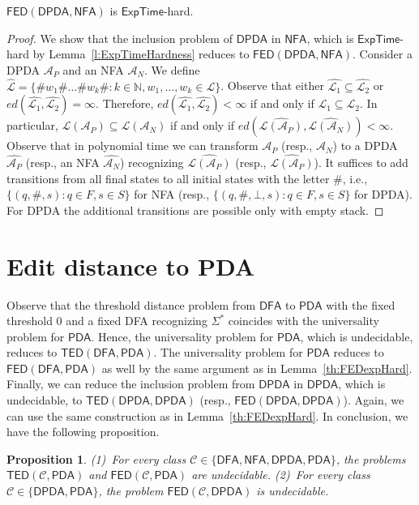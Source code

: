 \documentclass{CSML}
\newcommand{\aut}{\mathcal{A}}
\newcommand{\EXPTIME}{\textsf{ExpTime}}
\newcommand{\class}{\mathcal{C}}
\newcommand{\DFA}{\mathsf{DFA}}
\newcommand{\NFA}{\mathsf{NFA}}
\newcommand{\PDA}{\mathsf{PDA}}
\newcommand{\DPDA}{\mathsf{DPDA}}
\newcommand{\TED}{\mathsf{TED}}
\newcommand{\FED}{\mathsf{FED}}
\newcommand{\N}{\mathbb{N}}
\newcommand{\lang}{\mathcal{L}}
\newcommand{\ed}{ed}
\newtheorem{proposition}[theorem]{Proposition}
\begin{document}
\begin{lem}
$\FED(\DPDA,\NFA)$ is $\EXPTIME$-hard.
\label{th:FEDexpHard}
\end{lem}
\begin{proof}
We show that the inclusion problem of $\DPDA$ in $\NFA$, which is $\EXPTIME$-hard by Lemma~\ref{l:ExpTimeHardness} reduces to 
$\FED(\DPDA,\NFA)$. 
Consider  a DPDA $\aut_P$ and an NFA $\aut_N$.
We define $\widehat{\lang} = \{ \# w_1 \# \ldots \# w_k \# : k \in \N, w_1, \ldots, w_k \in \lang\}$.
Observe that either  $\widehat{\lang_1} \subseteq \widehat{\lang_2}$ or $\ed(\widehat{\lang_1},\widehat{\lang_2}) = \infty$.
Therefore, $\ed(\widehat{\lang_1},\widehat{\lang_2}) < \infty$ if and only if 
$\lang_1 \subseteq \lang_2$. 
In particular, $\lang(\aut_P) \subseteq \lang(\aut_N)$ if and only if
$\ed(\widehat{\lang(\aut_P)},\widehat{\lang(\aut_N)}) < \infty$.
Observe that in polynomial time we can transform $\aut_P$ (resp., $\aut_N$) to 
a DPDA $\widehat{\aut_P}$ (resp., an NFA $\widehat{\aut_N}$) recognizing
$\widehat{\lang(\aut_P)}$ (resp., $\widehat{\lang(\aut_P)}$). 
It suffices to add transitions 
from all final states to all initial states with the letter $\#$, i.e.,
$\{ (q,\#,s) : q \in F, s \in S \}$ for NFA (resp., $\{ (q,\#, \bot,s) : q \in F, s \in S \}$ for DPDA).
For DPDA the additional transitions are possible only with empty stack.
\end{proof}



 

\section{Edit distance to PDA}
\makeatletter{}\label{s:fromPDA}

Observe that the threshold distance problem from $\DFA$ to $\PDA$ with the fixed threshold $0$
and a fixed DFA recognizing $\Sigma^*$ coincides with the universality problem for $\PDA$. 
Hence, the universality problem for $\PDA$, which is undecidable, reduces to $\TED(\DFA, \PDA)$.
The universality problem for $\PDA$ reduces to $\FED(\DFA, \PDA)$ as well by 
the same argument as in Lemma~\ref{th:FEDexpHard}. 
Finally, we can reduce the inclusion problem from $\DPDA$ in $\DPDA$, which is undecidable, to
$\TED(\DPDA, \DPDA)$ (resp., $\FED(\DPDA, \DPDA)$). Again, we can use 
the same construction as in Lemma~\ref{th:FEDexpHard}. 
In conclusion, we have the following proposition.

\begin{proposition}
(1)~For every class $\class \in \{ \DFA, \NFA, \DPDA, \PDA \}$, the problems
$\TED(\class, \PDA)$ and $\FED(\class, \PDA)$ are undecidable.
(2)~For every class $\class \in \{ \DPDA, \PDA \}$, the problem
$\FED(\class, \DPDA)$ is undecidable.
\label{p:undecidable}
\end{proposition}
\end{document}

